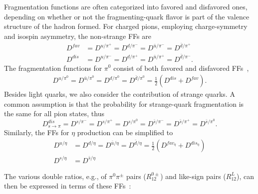 Fragmentation functions are often categorized into favored and disfavored ones, depending on whether or not the fragmenting-quark flavor is part of the valence structure of the hadron formed. For charged pions, employing charge-symmetry and isospin asymmetry, the non-strange FFs are 
\begin{equation}
\begin{aligned}
D^{fav}&=D^{u/{\pi^+}}=D^{d/{\pi^-}}=D^{\bar{u}/{\pi^-}}=D^{\bar{d}/{\pi^+}}\\
D^{dis}&=D^{u/{\pi^-}}=D^{d/{\pi^+}}=D^{\bar{u}/{\pi^+}}=D^{\bar{d}/{\pi^-}}.
\label{eqn:FF4}
\end{aligned}
\end{equation}
The fragmentation functions for $\pi^0$ consist of both favored and disfavored FFs~\cite{FoundationsofpQCD,Efremov:2006qm},
\begin{equation}
\begin{aligned}
D^{u/{\pi^0}}=D^{\bar{u}/{\pi^0}}=D^{d/{\pi^0}}=D^{\bar{d}/{\pi^0}}=\frac{1}{2}(D^{dis}+D^{fav}).
\label{eqn:FF4pi0}
\end{aligned}
\end{equation}
Besides light quarks, we also consider the contribution of strange quarks.
A common assumption is that the probability for strange-quark fragmentation is the same for all pion states, thus
\begin{equation}
D^{dis}_{s\rightarrow\pi}=D^{s/{\pi^-}}=D^{s/{\pi^+}}=D^{s/{\pi^0}}=D^{\bar{s}/{\pi^-}}=D^{\bar{s}/{\pi^+}}=D^{\bar{s}/{\pi^0}}.
\end{equation}
%
Similarly, the FFs for $\eta$ production can be simplified to 
%
\begin{equation}
\begin{aligned}
D^{u/{\eta}}&=D^{d/{\eta}}=D^{\bar{u}/{\eta}}=D^{\bar{d}/{\eta}}=\frac{1}{2}\left(D^{fav_\eta}+D^{dis_\eta}\right) \\
D^{s/{\eta}}&=D^{\bar{s}/{\eta}}
\label{eqn:FFetaquark}
\end{aligned}
\end{equation}

 
The various double ratios, e.g., of $\pi^0\pi^{\pm}$ pairs ($R^{0\pm}_{12}$) and like-sign pairs ($R^L_{12}$), can then be expressed in terms of these FFs~\cite{Efremov:2006qm}:


